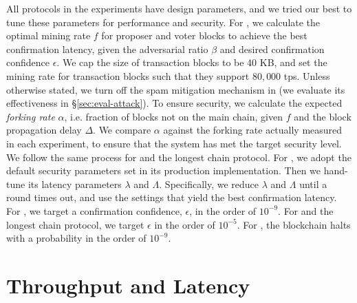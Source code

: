 
{} All protocols in the experiments have design parameters, and we tried our best to tune these parameters for performance and security. For \prism, we calculate the optimal mining rate $f$ for proposer and voter blocks to achieve the best confirmation latency, given the adversarial ratio $\beta$ and desired confirmation confidence $\epsilon$. We cap the size of transaction blocks to be 40 KB, and set the mining rate for transaction blocks such that they support $80,000$ tps. Unless otherwise stated, we turn off the spam mitigation mechanism in \prism (we evaluate its effectiveness in \S\ref{sec:eval-attack}).  To ensure security, we calculate the expected {\em forking rate} $\alpha$, i.e. fraction of blocks not on the main chain, given $f$ and the block propagation delay $\Delta$. We compare $\alpha$ against the forking rate actually measured in each experiment, to ensure that the system has met the target security level. We follow the same process for \bng and the longest chain protocol. For \algorand, we adopt the default security parameters set in its production implementation. Then we hand-tune its latency parameters $\lambda$ and $\Lambda$. Specifically, we reduce $\lambda$ and $\Lambda$ until a round times out, and use the settings that yield the best confirmation latency. For \prism, we target a confirmation confidence, $\epsilon$, in the order of $10^{-9}$. For \bng and the longest chain protocol, we target $\epsilon$ in the order of $10^{-5}$. For \algorand, the blockchain halts with a probability in the order of $10^{-9}$.

\section{Throughput and Latency}
\label{sec:eval-performance}

